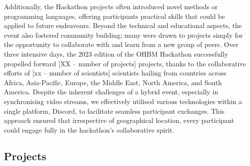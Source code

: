 \documentclass{article}
\begin{document}
Additionally, the Hackathon projects often introduced novel methods or programming languages, offering participants practical skills that could be applied to future endeavours.
Beyond the technical and educational aspects, the event also fostered community building; many were drawn to projects simply for the opportunity to collaborate with and learn from a new group of peers.
Over three intensive days, the 2023 edition of the OHBM Hackathon successfully propelled forward [XX – number of projects] projects, thanks to the collaborative efforts of [xx – number of scientists] scientists hailing from countries across Africa, Asia-Pacific, Europe, the Middle East, North America, and South America.
Despite the inherent challenges of a hybrid event, especially in synchronising video streams, we effectively utilised various technologies within a single platform, Discord, to facilitate seamless participant exchanges.
This approach ensured that irrespective of geographical location, every participant could engage fully in the hackathon's collaborative spirit.

\subsection{Projects}

\end{document}
